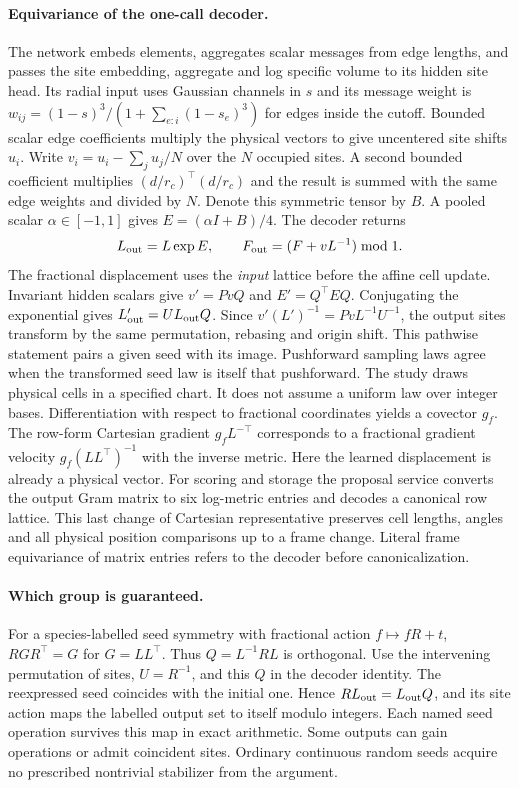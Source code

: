 \paragraph{Equivariance of the one-call decoder.}
The network embeds elements, aggregates scalar messages from edge lengths, and passes
the site embedding, aggregate and log specific volume to its hidden site head. Its radial
input uses Gaussian channels in $s$ and its message weight is
$w_{ij}=(1-s)^3/(1+\sum_{e:i}(1-s_e)^3)$ for edges inside the cutoff.
Bounded scalar edge coefficients multiply the physical vectors to give uncentered
site shifts $u_i$. Write $v_i=u_i-\sum_j u_j/N$ over the $N$ occupied sites. A second
bounded coefficient multiplies $(d/r_c)^\top(d/r_c)$ and the result is summed with the
same edge weights and divided by $N$. Denote this symmetric tensor by $B$. A pooled
scalar $\alpha\in[-1,1]$ gives $E=(\alpha I+B)/4$. The decoder returns
\[
 L_{\rm out}=L\exp E,\qquad
 F_{\rm out}=(F+vL^{-1})\bmod1 .
\]
The fractional displacement uses the \emph{input} lattice before the affine cell update.
Invariant hidden scalars give $v'=PvQ$ and $E'=Q^\top E Q$. Conjugating the exponential
gives $L'_{\rm out}=UL_{\rm out}Q$. Since
$v'(L')^{-1}=PvL^{-1}U^{-1}$, the output sites transform by the same permutation,
rebasing and origin shift. This pathwise statement pairs a given seed with its image.
Pushforward sampling laws agree when the transformed seed law is itself that pushforward.
The study draws physical cells in a specified chart. It does not assume a uniform law
over integer bases. Differentiation with respect to fractional coordinates yields a
covector $g_f$. The row-form Cartesian gradient $g_fL^{-\top}$ corresponds to a
fractional gradient velocity $g_f(LL^\top)^{-1}$ with the inverse metric.
Here the learned displacement is already a physical vector. For scoring and storage the
proposal service converts the output Gram matrix to six log-metric entries and decodes
a canonical row lattice. This last change of Cartesian representative preserves cell
lengths, angles and all physical position comparisons up to a frame change. Literal
frame equivariance of matrix entries refers to the decoder before canonicalization.

\paragraph{Which group is guaranteed.}
For a species-labelled seed symmetry with fractional action $f\mapsto fR+t$,
$RGR^\top=G$ for $G=LL^\top$. Thus $Q=L^{-1}RL$ is orthogonal.
Use the intervening permutation of sites, $U=R^{-1}$, and this $Q$ in the decoder
identity. The reexpressed seed coincides with the initial one. Hence
$RL_{\rm out}=L_{\rm out}Q$, and its site action maps the labelled output set to
itself modulo integers. Each named seed operation survives this map in exact arithmetic.
Some outputs can gain operations or admit coincident sites. Ordinary continuous random
seeds acquire no prescribed nontrivial stabilizer from the argument.

